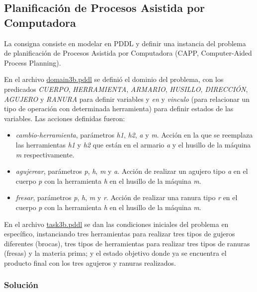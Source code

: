 \documentclass[onecolumn]{article}
\providecommand{\tightlist}{%
  \setlength{\itemsep}{0pt}\setlength{\parskip}{0pt}}
\begin{document}
\hypertarget{planificaciuxf3n-de-procesos-asistida-por-computadora}{%
\subsection{Planificación de Procesos Asistida por
Computadora}\label{planificaciuxf3n-de-procesos-asistida-por-computadora}}

La consigna consiste en modelar en PDDL y definir una instancia del
problema de planificación de Procesos Asistida por Computadora (CAPP,
Computer-Aided Process Planning).

En el archivo \href{planning/domain3b.pddl}{domain3b.pddl} se definió el
dominio del problema, con los predicados \emph{CUERPO},
\emph{HERRAMIENTA}, \emph{ARMARIO}, \emph{HUSILLO}, \emph{DIRECCIÓN},
\emph{AGUJERO} y \emph{RANURA} para definir variables y \emph{en} y
\emph{vinculo} (para relacionar un tipo de operación con determinada
herramienta) para definir estados de las variables. Las acciones
definidas fueron:

\begin{itemize}
\tightlist
\item
  \emph{cambio-herramienta}, parámetros \emph{h1}, \emph{h2}, \emph{a} y
  \emph{m}. Acción en la que se reemplaza las herramientas \emph{h1} y
  \emph{h2} que están en el armario \emph{a} y el husillo de la máquina
  \emph{m} respectivamente.
\item
  \emph{agujerear}, parámetros \emph{p}, \emph{h}, \emph{m} y \emph{a}.
  Acción de realizar un agujero tipo \emph{a} en el cuerpo \emph{p} con
  la herramienta \emph{h} en el husillo de la máquina \emph{m}.
\item
  \emph{fresar}, parámetros \emph{p}, \emph{h}, \emph{m} y \emph{r}.
  Acción de realizar una ranura tipo \emph{r} en el cuerpo \emph{p} con
  la herramienta \emph{h} en el husillo de la máquina \emph{m}.
\end{itemize}

En el archivo \href{planning/task3b.pddl}{task3b.pddl} se dan las
condiciones iniciales del problema en específico, instanciando tres
herramientas para realizar tres tipos de gujeros diferentes (brocas),
tres tipos de herramientas para realizar tres tipos de ranuras (fresas)
y la materia prima; y el estado objetivo donde ya se encuentra el
producto final con los tres agujeros y ranuras realizados.

\hypertarget{soluciuxf3n-1}{%
\subsubsection{Solución}\label{soluciuxf3n-1}}
\end{document}
